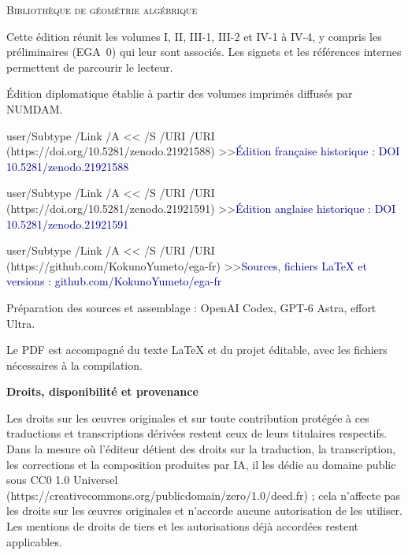 \documentclass[11pt,a4paper]{article}
\newcommand{\editionlink}[2]{\leavevmode\pdfstartlink user{/Subtype /Link /A << /S /URI /URI (#1) >>}\textcolor{navy}{#2}\pdfendlink}
\begin{document}
\color{navy}
\noindent\textsc{Bibliothèque de géométrie algébrique}\par
\vspace{22mm}
\par
\vspace{9mm}
\par
\vspace{18mm}
\par
\vspace{3mm}
\par
\vspace{10mm}
\color{muted}
\noindent Cette édition réunit les volumes I, II, III-1, III-2 et IV-1 à IV-4,
y compris les préliminaires (EGA~0) qui leur sont associés.
Les signets et les références internes permettent de parcourir le lecteur.\par
\vspace{5mm}
\noindent Édition diplomatique établie à partir des volumes imprimés
diffusés par NUMDAM.\par
\vspace{9mm}
\noindent\editionlink{https://doi.org/10.5281/zenodo.21921588}{Édition française historique : DOI 10.5281/zenodo.21921588}\par
\vspace{3mm}
\noindent\editionlink{https://doi.org/10.5281/zenodo.21921591}{Édition anglaise historique : DOI 10.5281/zenodo.21921591}\par
\vspace{3mm}
\noindent\editionlink{https://github.com/KokunoYumeto/ega-fr}{Sources, fichiers LaTeX et versions : github.com/KokunoYumeto/ega-fr}\par
\vfill
\small
\noindent Préparation des sources et assemblage : OpenAI Codex,
GPT-6 Astra, effort Ultra.\par
\vspace{3mm}
\noindent Le PDF est accompagné du texte LaTeX et du projet éditable,
avec les fichiers nécessaires à la compilation.\par

\clearpage
\begingroup
\small
\noindent\textbf{Droits, disponibilité et provenance}

Les droits sur les œuvres originales et sur toute contribution protégée à ces traductions et transcriptions dérivées restent ceux de leurs titulaires respectifs. Dans la mesure où l'éditeur détient des droits sur la traduction, la transcription, les corrections et la composition produites par IA, il les dédie au domaine public sous CC0 1.0 Universel (https://creativecommons.org/publicdomain/zero/1.0/deed.fr) ; cela n'affecte pas les droits sur les œuvres originales et n'accorde aucune autorisation de les utiliser. Les mentions de droits de tiers et les autorisations déjà accordées restent applicables.
\end{document}
